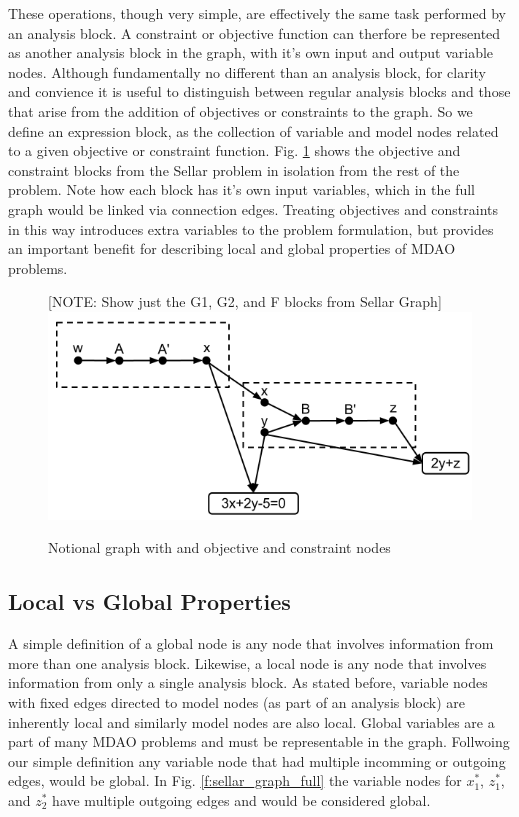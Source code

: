 These operations, though very simple, are effectively the same task 
performed by an analysis block. A constraint or objective function can therfore 
be represented as another analysis block in the graph, with it's own input and 
output variable nodes. Although fundamentally no different than an analysis block, 
for clarity and convience it is useful to distinguish between regular analysis 
blocks and those that arise from the addition of objectives or constraints to 
the graph. So we define an expression block, as the collection of variable and model 
nodes related to a given objective or constraint function. Fig. \ref{f:obj-cons}
shows the objective and constraint blocks from the Sellar problem in isolation 
from the rest of the problem. Note how each block has it's own input variables, 
which in the full graph would be linked via connection edges. Treating objectives 
and constraints in this way introduces extra variables to the problem formulation,
but provides an important benefit for describing local and global properties of 
MDAO problems.  


\begin{figure}[htb!]
  \begin{center}
    [NOTE: Show just the G1, G2, and F blocks from Sellar Graph]
    \includegraphics[width=.6\textwidth]{images/obj_const_graph}
  \end{center}
  \caption{Notional graph with and objective and constraint nodes \label{f:obj-cons}}
\end{figure}


\subsection{Local vs Global Properties}

  A simple definition of a global node is any node that involves information 
  from more than one analysis block. Likewise, a local node is any node 
  that involves information from only a single analysis block. As stated before, variable 
  nodes with fixed edges directed to model nodes (as part of an analysis block) are inherently local 
  and similarly model nodes are also local. Global variables are a part of many 
  MDAO problems and must be representable in the graph. Follwoing our simple definition
  any variable node that had multiple incomming or outgoing edges, would be global. 
  In Fig. \ref{f:sellar_graph_full} the variable nodes for $x_1^*$, $z_1^*$, and $z_2^*$ 
  have multiple outgoing edges and would be considered global. 

